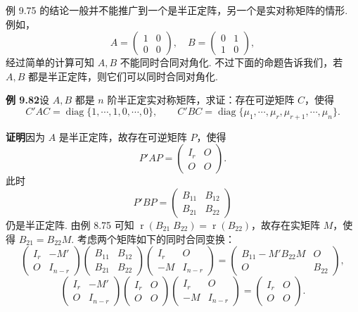 \documentclass[UTF8,12pt,a4paper,fontset=fandol]{ctexart}
\begin{document}
例 9.75 的结论一般并不能推广到一个是半正定阵，另一个是实对称矩阵的情形. 例如，
\[
A=\begin{pmatrix}1&0\\0&0\end{pmatrix},\quad
B=\begin{pmatrix}0&1\\1&0\end{pmatrix},
\]
经过简单的计算可知 $A,B$ 不能同时合同对角化. 不过下面的命题告诉我们，若 $A,B$ 都是半正定阵，则它们可以同时合同对角化.

\noindent\textbf{例 9.82}\quad 设 $A,B$ 都是 $n$ 阶半正定实对称矩阵，求证：存在可逆矩阵 $C$，使得
\[
C'AC=\operatorname{diag}\{1,\cdots,1,0,\cdots,0\},\qquad
C'BC=\operatorname{diag}\{\mu_1,\cdots,\mu_r,\mu_{r+1},\cdots,\mu_n\}.
\]

\noindent\textbf{证明}\quad 因为 $A$ 是半正定阵，故存在可逆矩阵 $P$，使得
\[
P'AP=\begin{pmatrix}
I_r&O\\
O&O
\end{pmatrix}.
\]
此时
\[
P'BP=\begin{pmatrix}
B_{11}&B_{12}\\
B_{21}&B_{22}
\end{pmatrix}
\]
仍是半正定阵. 由例 8.75 可知 $\operatorname{r}(B_{21}\;B_{22})=\operatorname{r}(B_{22})$，故存在实矩阵 $M$，使得 $B_{21}=B_{22}M$. 考虑两个矩阵如下的同时合同变换：
\[
\begin{pmatrix}
I_r&-M'\\
O&I_{n-r}
\end{pmatrix}
\begin{pmatrix}
B_{11}&B_{12}\\
B_{21}&B_{22}
\end{pmatrix}
\begin{pmatrix}
I_r&O\\
-M&I_{n-r}
\end{pmatrix}
=
\begin{pmatrix}
B_{11}-M'B_{22}M&O\\
O&B_{22}
\end{pmatrix},
\]
\[
\begin{pmatrix}
I_r&-M'\\
O&I_{n-r}
\end{pmatrix}
\begin{pmatrix}
I_r&O\\
O&O
\end{pmatrix}
\begin{pmatrix}
I_r&O\\
-M&I_{n-r}
\end{pmatrix}
=
\begin{pmatrix}
I_r&O\\
O&O
\end{pmatrix}.
\]
\end{document}
